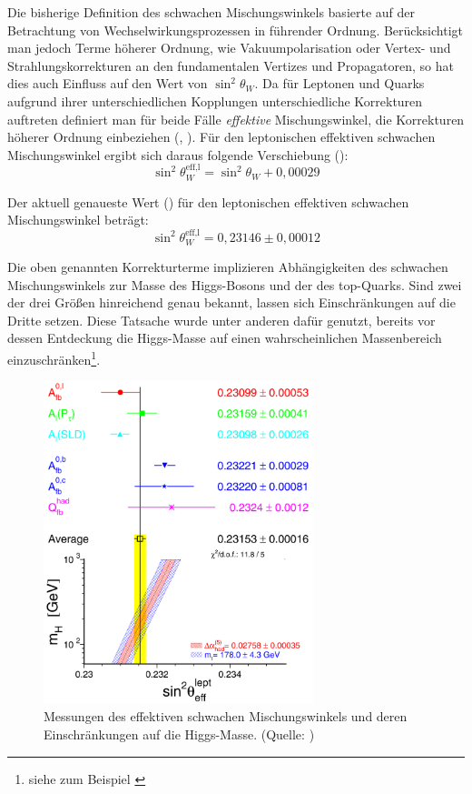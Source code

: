 Die bisherige Definition des schwachen Mischungswinkels basierte auf der
Betrachtung von Wechselwirkungsprozessen in führender Ordnung. Berücksichtigt
man jedoch Terme höherer Ordnung, wie Vakuumpolarisation oder Vertex- und
Strahlungskorrekturen an den fundamentalen Vertizes und Propagatoren, so hat
dies auch Einfluss auf den Wert von $\sin^2\theta_W$. Da für Leptonen und
Quarks aufgrund ihrer unterschiedlichen Kopplungen unterschiedliche Korrekturen
auftreten definiert man für beide Fälle \textit{effektive} Mischungswinkel, die
Korrekturen höherer Ordnung einbeziehen (\cite{Baur:1997wa},
\cite{CarloniCalame:2005vc}). Für den leptonischen effektiven schwachen
Mischungswinkel ergibt sich daraus folgende Verschiebung
(\cite{PhysRevD.86.010001}):
\begin{equation}
    \sin^2\theta_W^\text{eff,l} = \sin^2\theta_W + 0,00029
    \label{eq:effective_angle}
\end{equation}

Der aktuell genaueste  Wert (\cite{PhysRevD.86.010001}) für den leptonischen
effektiven schwachen Mischungswinkel beträgt:
\begin{equation}
    \sin^2\theta_W^\text{eff,l} = 0,23146 \pm 0,00012
    \label{eq:literature_value}
\end{equation}

Die oben genannten Korrekturterme implizieren Abhängigkeiten des schwachen
Mischungswinkels zur Masse des Higgs-Bosons und der des top-Quarks. Sind zwei
der drei Größen hinreichend genau bekannt, lassen sich Einschränkungen auf die
Dritte setzen. Diese Tatsache wurde unter anderen dafür genutzt, bereits vor
dessen Entdeckung die Higgs-Masse auf einen wahrscheinlichen Massenbereich
einzuschränken\footnote{siehe zum Beispiel \cite{Baur:1996zi}}.

\begin{figure}[h]
    \centering
    \includegraphics[width=0.7\textwidth]{img/higgs_constraints}
    \caption[Messungen des effektiven schwachen Mischungswinkels und deren
    Einschränkungen auf die Higgs-Masse]
    {Messungen des effektiven schwachen Mischungswinkels und deren
    Einschränkungen auf die Higgs-Masse. (Quelle: \cite{ALEPH:2005ab})}
    \label{fig:higgs_constraints}
\end{figure}

